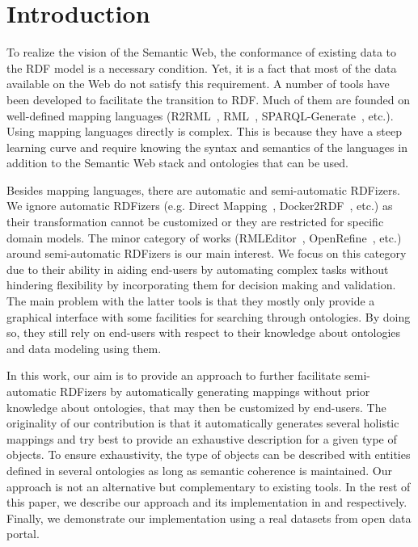 \section{Introduction}

To realize the vision of the Semantic Web, the conformance of existing data to the RDF model is a necessary condition. Yet, it is a fact that most of the data available on the Web do not satisfy this requirement. A number of tools have been developed to facilitate the transition to RDF. Much of them are founded on well-defined mapping languages (R2RML~\cite{R2RML_W3C:12}, RML~\cite{dimou2014rml}, SPARQL-Generate~\cite{lefranccois2016flexible}, etc.). Using mapping languages directly is complex. This is because they have a steep learning curve and require knowing the syntax and semantics of the languages in addition to the Semantic Web stack and ontologies that can be used. 

Besides mapping languages, there are automatic and semi-automatic RDFizers. We ignore automatic RDFizers (e.g. Direct Mapping~\cite{Direct_Mapping_W3C:12}, Docker2RDF~\cite{ayed2017docker2rdf}, etc.) as their transformation cannot be customized or they are restricted for specific domain models. The minor category of works (RMLEditor~\cite{heyvaert2016rmleditor}, OpenRefine~\cite{verborgh2013using}, etc.) around semi-automatic RDFizers is our main interest. We focus on this category due to their ability in aiding end-users by automating complex tasks without hindering flexibility by incorporating them for decision making and validation. The main problem with the latter tools is that they mostly only provide a graphical interface with some facilities for searching through ontologies. By doing so, they still rely on end-users with respect to their knowledge about ontologies and data modeling using them.

In this work, our aim is to provide an approach to further facilitate semi-automatic RDFizers by automatically generating mappings without prior knowledge about ontologies, that may then be customized by end-users. The originality of our contribution is that it automatically generates several holistic mappings and try best to provide an exhaustive description for a given type of objects. To ensure exhaustivity, the type of objects can be described with entities defined in several ontologies as long as semantic coherence is maintained. Our approach is not an alternative but complementary to existing tools. In the rest of this paper, we describe our approach and its implementation in  and  respectively. Finally, we demonstrate our implementation using a real datasets from open data portal. 

